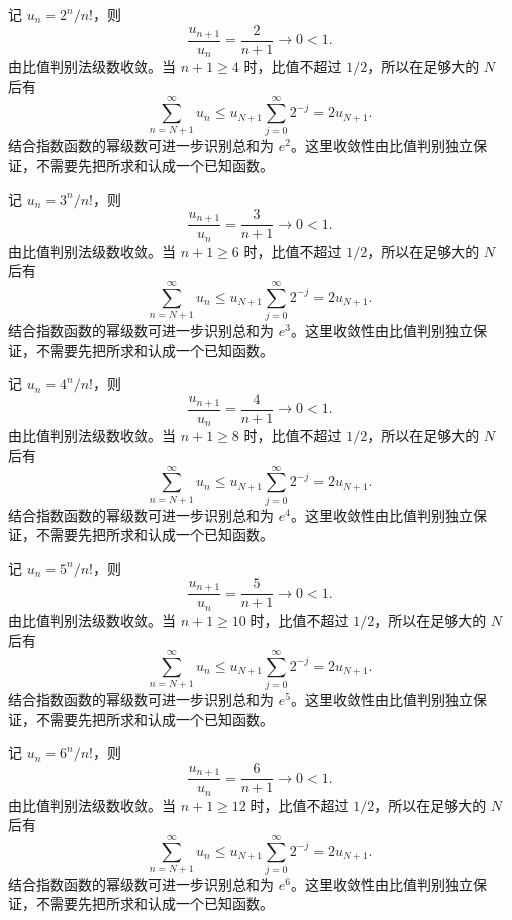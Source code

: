 \documentclass[12pt,fontset=fandol]{ctexart}
\begin{document}
\begin{solve}\label{ans:c24q14}
记 $u_n=2^n/n!$，则
\[
\frac{u_{n+1}}{u_n}=\frac{2}{n+1}\longrightarrow0<1.
\]
由比值判别法级数收敛。当 $n+1\ge 4$ 时，比值不超过 $1/2$，所以在足够大的 $N$ 后有
\[
\sum_{n=N+1}^\infty u_n\le u_{N+1}\sum_{j=0}^\infty2^{-j}=2u_{N+1}.
\]
结合指数函数的幂级数可进一步识别总和为 $e^{2}$。这里收敛性由比值判别独立保证，不需要先把所求和认成一个已知函数。
\end{solve}

\begin{solve}\label{ans:c24q15}
记 $u_n=3^n/n!$，则
\[
\frac{u_{n+1}}{u_n}=\frac{3}{n+1}\longrightarrow0<1.
\]
由比值判别法级数收敛。当 $n+1\ge 6$ 时，比值不超过 $1/2$，所以在足够大的 $N$ 后有
\[
\sum_{n=N+1}^\infty u_n\le u_{N+1}\sum_{j=0}^\infty2^{-j}=2u_{N+1}.
\]
结合指数函数的幂级数可进一步识别总和为 $e^{3}$。这里收敛性由比值判别独立保证，不需要先把所求和认成一个已知函数。
\end{solve}

\begin{solve}\label{ans:c24q16}
记 $u_n=4^n/n!$，则
\[
\frac{u_{n+1}}{u_n}=\frac{4}{n+1}\longrightarrow0<1.
\]
由比值判别法级数收敛。当 $n+1\ge 8$ 时，比值不超过 $1/2$，所以在足够大的 $N$ 后有
\[
\sum_{n=N+1}^\infty u_n\le u_{N+1}\sum_{j=0}^\infty2^{-j}=2u_{N+1}.
\]
结合指数函数的幂级数可进一步识别总和为 $e^{4}$。这里收敛性由比值判别独立保证，不需要先把所求和认成一个已知函数。
\end{solve}

\begin{solve}\label{ans:c24q17}
记 $u_n=5^n/n!$，则
\[
\frac{u_{n+1}}{u_n}=\frac{5}{n+1}\longrightarrow0<1.
\]
由比值判别法级数收敛。当 $n+1\ge 10$ 时，比值不超过 $1/2$，所以在足够大的 $N$ 后有
\[
\sum_{n=N+1}^\infty u_n\le u_{N+1}\sum_{j=0}^\infty2^{-j}=2u_{N+1}.
\]
结合指数函数的幂级数可进一步识别总和为 $e^{5}$。这里收敛性由比值判别独立保证，不需要先把所求和认成一个已知函数。
\end{solve}

\begin{solve}\label{ans:c24q18}
记 $u_n=6^n/n!$，则
\[
\frac{u_{n+1}}{u_n}=\frac{6}{n+1}\longrightarrow0<1.
\]
由比值判别法级数收敛。当 $n+1\ge 12$ 时，比值不超过 $1/2$，所以在足够大的 $N$ 后有
\[
\sum_{n=N+1}^\infty u_n\le u_{N+1}\sum_{j=0}^\infty2^{-j}=2u_{N+1}.
\]
结合指数函数的幂级数可进一步识别总和为 $e^{6}$。这里收敛性由比值判别独立保证，不需要先把所求和认成一个已知函数。
\end{solve}
\end{document}
